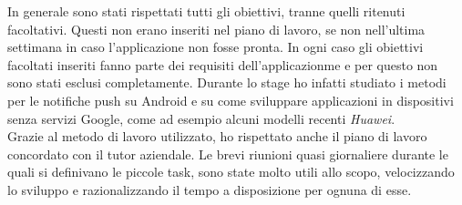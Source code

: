 \noindent In generale sono stati rispettati tutti gli obiettivi, tranne quelli ritenuti facoltativi. Questi non erano inseriti nel piano di lavoro, se
non nell'ultima settimana in caso l'applicazione non fosse pronta. In ogni caso gli obiettivi facoltati inseriti fanno parte dei requisiti
dell'applicazionme e per questo non sono stati esclusi completamente. Durante lo stage ho infatti studiato i metodi per le notifiche push su
\gls{Android} e su come sviluppare applicazioni in dispositivi senza servizi Google, come ad esempio alcuni modelli recenti \textit{Huawei}.
\\
\noindent Grazie al metodo di lavoro utilizzato, ho rispettato anche il piano di lavoro concordato con il tutor aziendale. Le brevi riunioni quasi
giornaliere durante le quali si definivano le piccole task, sono state molto utili allo scopo, velocizzando lo sviluppo e razionalizzando il
tempo a disposizione per ognuna di esse. 

